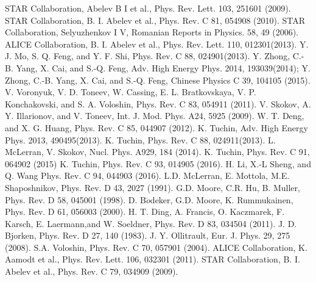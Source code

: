 \documentclass[twocolumn,showpacs,preprintnumbers,amsmath,amssymb]{revtex4}
\begin{document}
\begin{thebibliography}{}
 STAR Collaboration, Abelev B I et al., Phys. Rev. Lett. 103, 251601 (2009).
 STAR Collaboration, B. I. Abelev et al., Phys. Rev. C 81, 054908 (2010).
 STAR Collaboration, Selyuzhenkov I V, Romanian Reports in Physics. 58, 49 (2006).
 ALICE Collaboration, B. I. Abelev et al., Phys. Rev. Lett. 110, 012301(2013).
 Y. J. Mo, S. Q. Feng, and Y. F. Shi,  Phys. Rev. C 88,  024901(2013).
 Y. Zhong, C.-B. Yang, X. Cai, and S.-Q. Feng, Adv. High Energy Phys. 2014, 193039(2014); Y. Zhong, C.-B. Yang, X. Cai, and S.-Q. Feng, Chinese Physics C 39, 104105 (2015).
 V. Voronyuk, V. D. Toneev, W. Cassing, E. L. Bratkovskaya, V. P. Konchakovski, and S. A. Voloshin, Phys. Rev. C 83, 054911 (2011).
 V. Skokov, A. Y. Illarionov, and V. Toneev, Int. J. Mod. Phys. A24, 5925 (2009).
 W. T. Deng, and X. G. Huang, Phys. Rev. C 85, 044907 (2012).
 K. Tuchin,  Adv. High Energy Phys. 2013, 490495(2013).
 K. Tuchin, Phys. Rev. C 88, 024911(2013).
 L. McLerran, V. Skokov, Nucl. Phys. A929, 184 (2014).
 K. Tuchin, Phys. Rev. C 91, 064902 (2015)
 K. Tuchin, Phys. Rev. C 93, 014905 (2016).
 H. Li, X.-L Sheng, and Q. Wang Phys. Rev. C 94, 044903 (2016).
 L.D. McLerran, E. Mottola, M.E. Shaposhnikov, Phys. Rev. D 43, 2027 (1991).
 G.D. Moore, C.R. Hu, B. Muller, Phys. Rev. D 58,  045001 (1998).
 D. B$\ddot{o}$deker, G.D. Moore, K. Rummukainen, Phys. Rev. D 61, 056003 (2000).
 H. T. Ding, A. Francis, O. Kaczmarek, F. Karsch, E. Laermann,and W. Soeldner, Phys. Rev. D 83, 034504 (2011).
 J. D. Bjorken, Phys. Rev. D 27, 140 (1983).
 J. Y. Ollitrault, Eur. J. Phys. 29, 275 (2008).
 S.A. Voloshin, Phys. Rev. C 70, 057901 (2004).
 ALICE Collaboration, K. Aamodt et al., Phys. Rev. Lett. 106, 032301 (2011).
 STAR Collaboration, B. I. Abelev et al., Phys. Rev. C 79, 034909 (2009).
\end{thebibliography}{}
\end{document}
